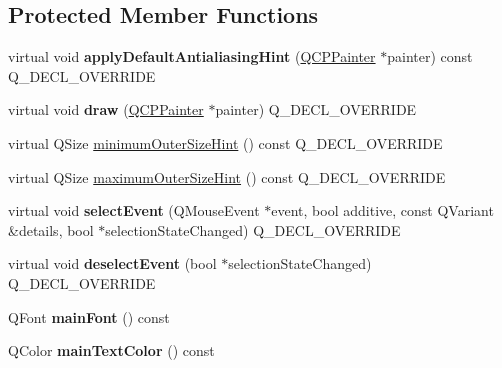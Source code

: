 \subsection*{Protected Member Functions}
\begin{DoxyCompactItemize}
\item 
\mbox{\label{classQCPTextElement_a91f2e4b4a639d9079e89a0030c7ed352}} 
virtual void {\bfseries apply\+Default\+Antialiasing\+Hint} (\hyperlink{classQCPPainter}{Q\+C\+P\+Painter} $\ast$painter) const Q\+\_\+\+D\+E\+C\+L\+\_\+\+O\+V\+E\+R\+R\+I\+DE
\item 
\mbox{\label{classQCPTextElement_ad1dae61ea77ae74841f3c2fb765fc88e}} 
virtual void {\bfseries draw} (\hyperlink{classQCPPainter}{Q\+C\+P\+Painter} $\ast$painter) Q\+\_\+\+D\+E\+C\+L\+\_\+\+O\+V\+E\+R\+R\+I\+DE
\item 
virtual Q\+Size \hyperlink{classQCPTextElement_a47b8541f55ff520c557e0f27461f109e}{minimum\+Outer\+Size\+Hint} () const Q\+\_\+\+D\+E\+C\+L\+\_\+\+O\+V\+E\+R\+R\+I\+DE
\item 
virtual Q\+Size \hyperlink{classQCPTextElement_ae82475b50c10a5b3314d996d50ae536b}{maximum\+Outer\+Size\+Hint} () const Q\+\_\+\+D\+E\+C\+L\+\_\+\+O\+V\+E\+R\+R\+I\+DE
\item 
\mbox{\label{classQCPTextElement_a8d696ea82fa7bf743e01858039c03525}} 
virtual void {\bfseries select\+Event} (Q\+Mouse\+Event $\ast$event, bool additive, const Q\+Variant \&details, bool $\ast$selection\+State\+Changed) Q\+\_\+\+D\+E\+C\+L\+\_\+\+O\+V\+E\+R\+R\+I\+DE
\item 
\mbox{\label{classQCPTextElement_a9a631a9deb9d82089a9d52de1744accf}} 
virtual void {\bfseries deselect\+Event} (bool $\ast$selection\+State\+Changed) Q\+\_\+\+D\+E\+C\+L\+\_\+\+O\+V\+E\+R\+R\+I\+DE
\item 
\mbox{\label{classQCPTextElement_ae236bd398e52939f2de2b70e5e2ba611}} 
Q\+Font {\bfseries main\+Font} () const
\item 
\mbox{\label{classQCPTextElement_a63510789e31db34362de97d78e9e7866}} 
Q\+Color {\bfseries main\+Text\+Color} () const
\end{DoxyCompactItemize}
